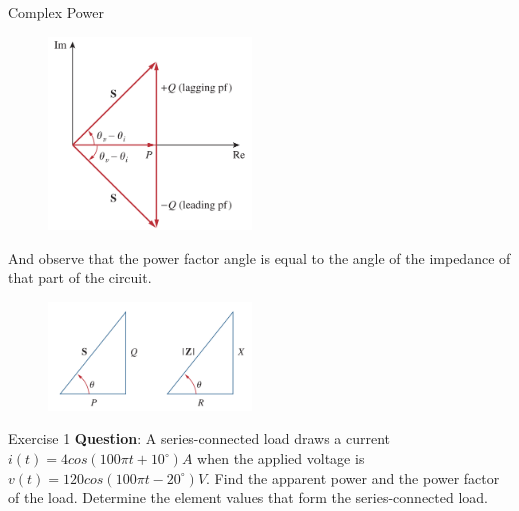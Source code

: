 \documentclass{beamer}
\begin{document}
\begin{frame}{Complex Power}

\begin{multicols}{2}
        \sectiont{}
\begin{figure}
    \centering
    \includegraphics[width=0.48\textwidth]{img_ch11/power triangle.png}
\end{figure}
        \sectiont{}
And observe that the power factor angle is equal to the angle of the impedance of that part of the circuit.
\begin{figure}
\centering
\includegraphics[width=0.48\textwidth]{img_ch11/pf.png}
\end{figure}
        
        
\end{multicols}
\end{frame}



\begin{frame}{Exercise 1}
\textbf{Question}:
\newline
A series-connected load draws a current $i(t)=4cos(100\pi t+10^{\circ}) A$ when the applied voltage is $v(t)=120cos(100\pi t-20^{\circ})V$. Find the apparent power and the power factor of the load. Determine the element values that form the series-connected load.
\end{frame}
\end{document}
